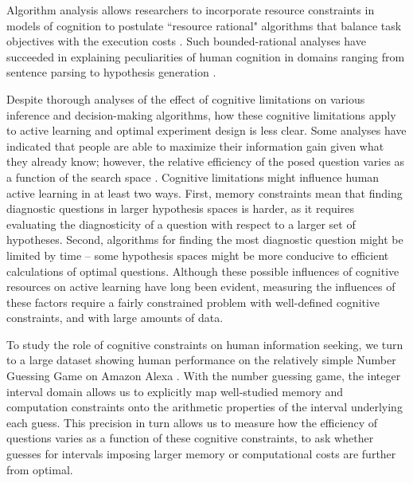 \documentclass[10pt,letterpaper]{article}
\begin{document}
Algorithm analysis allows researchers to incorporate resource constraints in models of cognition to postulate ``resource rational" algorithms that balance task objectives with the execution costs \cite{LiederResourcerationalanalysisUnderstanding2020, gershman2015computational}. 
Such bounded-rational analyses have succeeded in explaining peculiarities of human cognition in domains ranging from sentence parsing \cite{levy2009modeling} to hypothesis generation \cite{dasgupta2018remembrance}. 


Despite thorough analyses of the effect of cognitive limitations on various inference and decision-making algorithms, how these cognitive limitations apply to active learning and optimal experiment design is less clear. 
Some analyses have indicated that people are able to maximize their information gain given what they already know; however, the relative efficiency of the posed question varies as a function of the search space \cite{GureckisActiveLearningStrategies2009}.
Cognitive limitations might influence human active learning in at least two ways. 
First, memory constraints mean that finding diagnostic questions in larger hypothesis spaces is harder, as it requires evaluating the diagnosticity of a question with respect to a larger set of hypotheses.
Second, algorithms for finding the most diagnostic question might be limited by time -- some hypothesis spaces might be more conducive to efficient calculations of optimal questions.
Although these possible influences of cognitive resources on active learning have long been evident, measuring the influences of these factors require a fairly constrained problem with well-defined cognitive constraints, and with large amounts of data.

To study the role of cognitive constraints on human information seeking, we turn to a large dataset showing human performance on the relatively simple Number Guessing Game on Amazon Alexa \cite{Dobsonguessinggamemldataset2019}.
With the number guessing game, the integer interval domain allows us to explicitly map well-studied memory and computation constraints onto the arithmetic properties of the interval underlying each guess. 
This precision in turn allows us to measure how the efficiency of questions varies as a function of these cognitive constraints, to ask whether guesses for intervals imposing larger memory or computational costs are further from optimal.
\end{document}

